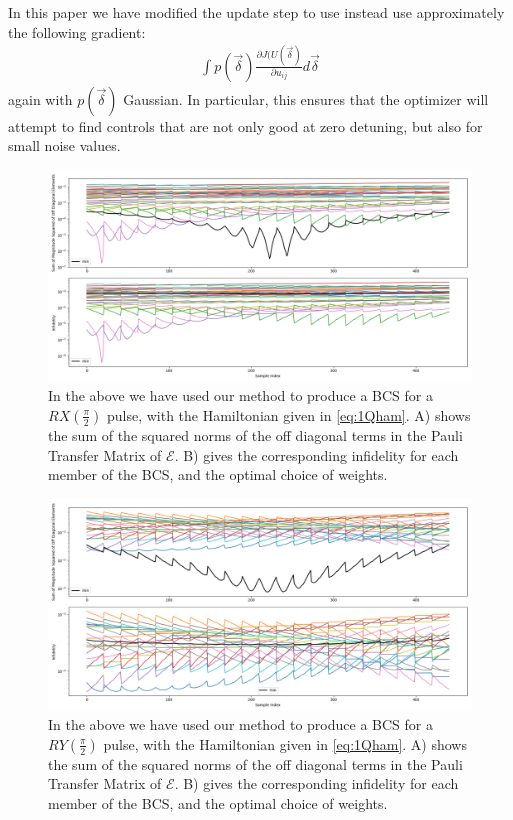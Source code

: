 \documentclass[aps,nofootinbib,pra,notitlepage,twocolumn]{revtex4-1}
\begin{document}
In this paper we have modified the update step to use instead use approximately the following gradient:
\begin{align}
\int p(\vec{\delta})\frac{\partial J(U(\vec{\delta})}{\partial u_{ij}} d\vec{\delta}
\end{align}
again with $p(\vec{\delta})$ Gaussian. In particular, this ensures that the optimizer will attempt to find controls that are not only good at zero detuning, but also for small noise values.
\begin{figure}
\centering
\includegraphics[width=\textwidth]{x2.png}
\caption{In the above we have used our method to produce a BCS for a $RX(\frac{\pi}{2})$ pulse, with the Hamiltonian given in \ref{eq:1Qham}. A) shows the sum of the squared norms of the off diagonal terms in the Pauli Transfer Matrix of $\mathcal{E}$. B) gives the corresponding infidelity for each member of the BCS, and the optimal choice of weights.}
\end{figure}
\begin{figure}
\centering
\includegraphics[width=\textwidth]{y2.png}
\caption{In the above we have used our method to produce a BCS for a $RY(\frac{\pi}{2})$ pulse, with the Hamiltonian given in \ref{eq:1Qham}. A) shows the sum of the squared norms of the off diagonal terms in the Pauli Transfer Matrix of $\mathcal{E}$. B) gives the corresponding infidelity for each member of the BCS, and the optimal choice of weights.}
\end{figure}
\end{document}
